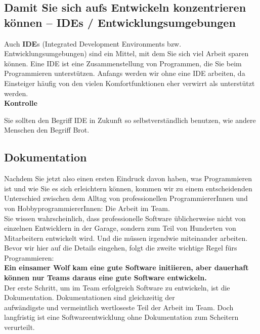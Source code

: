 \subsection[IDE - Entwicklungsumgebung]{Damit Sie sich aufs Entwickeln konzentrieren können – IDEs / Entwicklungsumgebungen}

Auch \textbf{IDE}s (Integrated Development Environments bzw. Entwicklungsumgebungen) sind ein Mittel, mit dem Sie sich viel Arbeit sparen können. Eine IDE ist eine Zusammenstellung von Programmen, die Sie beim Programmieren unterstützen. Anfangs werden wir ohne eine IDE arbeiten, da Einsteiger häufig von den vielen Komfortfunktionen eher verwirrt als unterstützt werden.\\

\textbf{Kontrolle}

Sie sollten den Begriff IDE in Zukunft so selbstverständlich benutzen, wie andere Menschen den Begriff Brot.

\subsection{Dokumentation}

Nachdem Sie jetzt also einen ersten Eindruck davon haben, was Programmieren ist und wie Sie es sich erleichtern können, kommen wir zu einem entscheidenden Unterschied zwischen dem Alltag von professionellen ProgrammiererInnen und von HobbyprogrammiererInnen: Die Arbeit im Team.\\

Sie wissen wahrscheinlich, dass professionelle Software üblicherweise nicht von einzelnen Entwicklern in der Garage, sondern zum Teil von Hunderten von Mitarbeitern entwickelt wird. Und die müssen irgendwie miteinander arbeiten. Bevor wir hier auf die Details eingehen, folgt die zweite wichtige Regel fürs Programmieren:\\

\label{rule002}\textbf{Ein einsamer Wolf kam eine gute Software initiieren, aber dauerhaft können nur Teams daraus eine gute Software entwickeln.}\\

Der erste Schritt, um im Team erfolgreich Software zu entwickeln, ist die Dokumentation. Dokumentationen sind gleichzeitig der \\aufwändigste und vermeintlich wertloseste Teil der Arbeit im Team. Doch langfristig ist eine Softwareentwicklung ohne Dokumentation zum Scheitern verurteilt.\\

